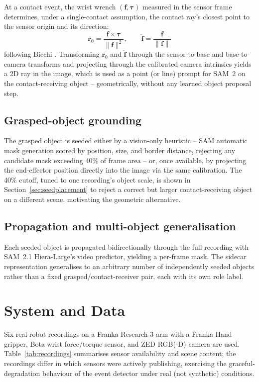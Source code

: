 \documentclass[letterpaper, 10pt, journal, twoside]{IEEEtran}
\begin{document}
At a contact event, the wrist wrench $(\mathbf{f}, \boldsymbol{\tau})$
measured in the sensor frame determines, under a single-contact
assumption, the contact ray's closest point to the sensor origin and its
direction:
\begin{equation}
  \mathbf{r}_0 = \frac{\mathbf{f} \times \boldsymbol{\tau}}{\lVert \mathbf{f} \rVert^2}, \qquad
  \hat{\mathbf{f}} = \frac{\mathbf{f}}{\lVert \mathbf{f} \rVert}
  \label{eq:bicchi}
\end{equation}
following Bicchi \cite{bicchi1990}. Transforming $\mathbf{r}_0$ and
$\hat{\mathbf{f}}$ through the sensor-to-base and base-to-camera
transforms and projecting through the calibrated camera intrinsics
yields a 2D ray in the image, which is used as a point (or line) prompt
for SAM~2 on the contact-receiving object -- geometrically, without any
learned object proposal step.

\subsection{Grasped-object grounding}

The grasped object is seeded either by a vision-only heuristic -- SAM
automatic mask generation scored by position, size, and border distance,
rejecting any candidate mask exceeding 40\% of frame area -- or, once
available, by projecting the end-effector position directly into the
image via the same calibration. The 40\% cutoff, tuned to one
recording's object scale, is shown in Section~\ref{sec:seedplacement} to
reject a correct but larger contact-receiving object on a different
scene, motivating the geometric alternative.

\subsection{Propagation and multi-object generalisation}

Each seeded object is propagated bidirectionally through the full
recording with SAM~2.1 Hiera-Large's video predictor, yielding a
per-frame mask. The sidecar representation generalises to an arbitrary
number of independently seeded objects rather than a fixed
grasped/contact-receiver pair, each with its own role label.

\section{System and Data}

Six real-robot recordings on a Franka Research 3 arm with a Franka Hand
gripper, Bota wrist force/torque sensor, and ZED RGB(-D) camera are used.
Table~\ref{tab:recordings} summarises sensor availability and scene
content; the recordings differ in which sensors were actively
publishing, exercising the graceful-degradation behaviour of the event
detector under real (not synthetic) conditions.
\end{document}

